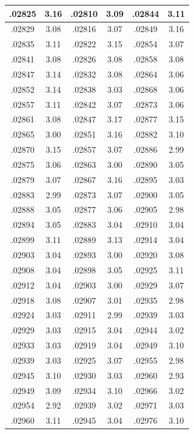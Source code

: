 \documentclass[11pt]{report}
\begin{document}
\begin{appendices}
\begin{longtable}{|c|c||c|c||c|c|}
.02825 & 3.16 & .02810 & 3.09 & .02844 & 3.11\\\hline
.02829 & 3.08 & .02816 & 3.07 & .02849 & 3.16\\\hline
.02835 & 3.11 & .02822 & 3.15 & .02854 & 3.07\\\hline
.02841 & 3.08 & .02826 & 3.08 & .02858 & 3.08\\\hline
.02847 & 3.14 & .02832 & 3.08 & .02864 & 3.06\\\hline
.02852 & 3.14 & .02838 & 3.03 & .02868 & 3.06\\\hline
.02857 & 3.11 & .02842 & 3.07 & .02873 & 3.06\\\hline
.02861 & 3.08 & .02847 & 3.17 & .02877 & 3.15\\\hline
.02865 & 3.00 & .02851 & 3.16 & .02882 & 3.10\\\hline
.02870 & 3.15 & .02857 & 3.07 & .02886 & 2.99\\\hline
.02875 & 3.06 & .02863 & 3.00 & .02890 & 3.05\\\hline
.02879 & 3.07 & .02867 & 3.16 & .02895 & 3.03\\\hline
.02883 & 2.99 & .02873 & 3.07 & .02900 & 3.05\\\hline
.02888 & 3.05 & .02877 & 3.06 & .02905 & 2.98\\\hline
.02894 & 3.05 & .02883 & 3.04 & .02910 & 3.04\\\hline
.02899 & 3.11 & .02889 & 3.13 & .02914 & 3.04\\\hline
.02903 & 3.04 & .02893 & 3.00 & .02920 & 3.08\\\hline
.02908 & 3.04 & .02898 & 3.05 & .02925 & 3.11\\\hline
.02912 & 3.04 & .02903 & 3.00 & .02929 & 3.07\\\hline
.02918 & 3.08 & .02907 & 3.01 & .02935 & 2.98\\\hline
.02924 & 3.03 & .02911 & 2.99 & .02939 & 3.03\\\hline
.02929 & 3.03 & .02915 & 3.04 & .02944 & 3.02\\\hline
.02933 & 3.03 & .02919 & 3.04 & .02949 & 3.10\\\hline
.02939 & 3.03 & .02925 & 3.07 & .02955 & 2.98\\\hline
.02945 & 3.10 & .02930 & 3.03 & .02960 & 2.93\\\hline
.02949 & 3.09 & .02934 & 3.10 & .02966 & 3.02\\\hline
.02954 & 2.92 & .02939 & 3.02 & .02971 & 3.03\\\hline
.02960 & 3.11 & .02945 & 3.04 & .02976 & 3.10\\\hline

\end{longtable}
\end{appendices}
\end{document}
